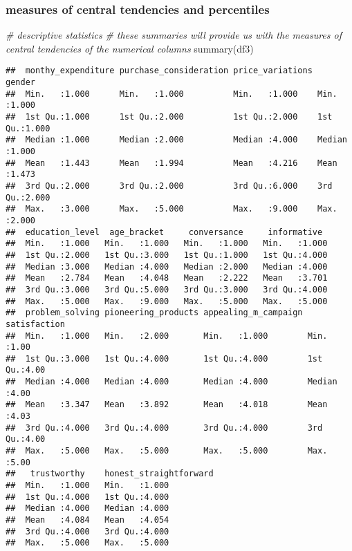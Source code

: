 \documentclass[
]{article}
\newenvironment{Shaded}{\begin{snugshade}}{\end{snugshade}}
\newcommand{\CommentTok}[1]{\textcolor[rgb]{0.56,0.35,0.01}{\textit{#1}}}
\newcommand{\FunctionTok}[1]{\textcolor[rgb]{0.00,0.00,0.00}{#1}}
\newcommand{\NormalTok}[1]{#1}
\begin{document}
\hypertarget{measures-of-central-tendencies-and-percentiles}{%
\subsubsection{measures of central tendencies and
percentiles}\label{measures-of-central-tendencies-and-percentiles}}

\begin{Shaded}
\begin{Highlighting}[]
\CommentTok{\# descriptive statistics}
\CommentTok{\# these summaries will provide us with the measures of central tendencies of the numerical columns}
\FunctionTok{summary}\NormalTok{(df3)}
\end{Highlighting}
\end{Shaded}

\begin{verbatim}
##  monthy_expenditure purchase_consideration price_variations     gender     
##  Min.   :1.000      Min.   :1.000          Min.   :1.000    Min.   :1.000  
##  1st Qu.:1.000      1st Qu.:2.000          1st Qu.:2.000    1st Qu.:1.000  
##  Median :1.000      Median :2.000          Median :4.000    Median :1.000  
##  Mean   :1.443      Mean   :1.994          Mean   :4.216    Mean   :1.473  
##  3rd Qu.:2.000      3rd Qu.:2.000          3rd Qu.:6.000    3rd Qu.:2.000  
##  Max.   :3.000      Max.   :5.000          Max.   :9.000    Max.   :2.000  
##  education_level  age_bracket     conversance     informative   
##  Min.   :1.000   Min.   :1.000   Min.   :1.000   Min.   :1.000  
##  1st Qu.:2.000   1st Qu.:3.000   1st Qu.:1.000   1st Qu.:4.000  
##  Median :3.000   Median :4.000   Median :2.000   Median :4.000  
##  Mean   :2.784   Mean   :4.048   Mean   :2.222   Mean   :3.701  
##  3rd Qu.:3.000   3rd Qu.:5.000   3rd Qu.:3.000   3rd Qu.:4.000  
##  Max.   :5.000   Max.   :9.000   Max.   :5.000   Max.   :5.000  
##  problem_solving pioneering_products appealing_m_campaign  satisfaction 
##  Min.   :1.000   Min.   :2.000       Min.   :1.000        Min.   :1.00  
##  1st Qu.:3.000   1st Qu.:4.000       1st Qu.:4.000        1st Qu.:4.00  
##  Median :4.000   Median :4.000       Median :4.000        Median :4.00  
##  Mean   :3.347   Mean   :3.892       Mean   :4.018        Mean   :4.03  
##  3rd Qu.:4.000   3rd Qu.:4.000       3rd Qu.:4.000        3rd Qu.:4.00  
##  Max.   :5.000   Max.   :5.000       Max.   :5.000        Max.   :5.00  
##   trustworthy    honest_straightforward
##  Min.   :1.000   Min.   :1.000         
##  1st Qu.:4.000   1st Qu.:4.000         
##  Median :4.000   Median :4.000         
##  Mean   :4.084   Mean   :4.054         
##  3rd Qu.:4.000   3rd Qu.:4.000         
##  Max.   :5.000   Max.   :5.000
\end{verbatim}
\end{document}
